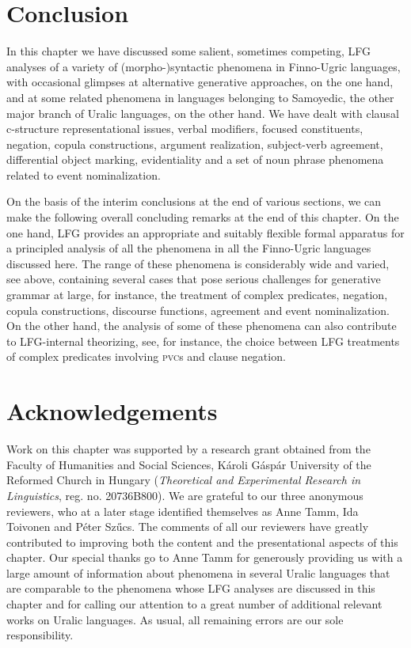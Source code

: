 \documentclass[output=paper,hidelinks]{langscibook}
\begin{document}
\section{Conclusion}
\label{sec:FinnoUgric:10}

In this chapter we have discussed some salient, sometimes competing, LFG analyses of a variety of (morpho-)syntactic phenomena in Finno-Ugric languages, with occasional glimpses at alternative generative approaches, on the one hand, and at some related phenomena in languages belonging to Samoyedic, the other major branch of Uralic languages, on the other hand. We have dealt with clausal c-structure representational issues, verbal modifiers, focused constituents, negation, copula constructions, argument realization, subject-verb agreement, differential object marking, evidentiality and a set of noun phrase phenomena related to event nominalization.

On the basis of the interim conclusions at the end of various sections, we can make the following overall concluding remarks at the end of this chapter. On the one hand, LFG provides an appropriate and suitably flexible formal apparatus for a principled analysis of all the phenomena in all the Finno-Ugric languages discussed here. The range of these phenomena is considerably wide and varied, see above, containing several cases that pose serious challenges for generative grammar at large, for instance, the treatment of complex predicates, negation, copula constructions, discourse functions, agreement and event nominalization. On the other hand, the analysis of some of these phenomena can also contribute to LFG{}-internal theorizing, see, for instance, the choice between LFG treatments of complex predicates involving \textsc{pvc}s and clause negation.


\section*{Acknowledgements}
Work on this chapter was supported by a research grant obtained from the Faculty of Humanities and Social Sciences, Károli Gáspár University of the Reformed Church in Hungary (\emph{Theoretical and Experimental Research in Linguistics}, reg. no. 20736B800). We are grateful to our three anonymous reviewers, who at a later stage identified themselves as Anne Tamm, Ida Toivonen and Péter Sz\H{u}cs. The comments of all our reviewers have greatly contributed to improving both the content and the presentational aspects of this chapter. Our special thanks go to Anne Tamm for generously providing us with a large amount of information about phenomena in several Uralic languages that are comparable to the phenomena whose LFG analyses are discussed in this chapter and for calling our attention to a great number of additional relevant works on Uralic languages. As usual, all remaining errors are our sole responsibility.
\end{document}
